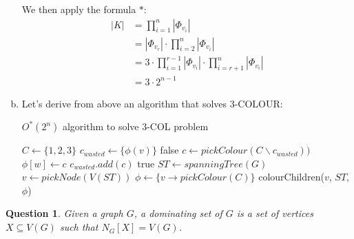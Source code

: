 \documentclass{article}
\newtheorem{Question}[theorem]{Question}
\begin{document}
\begin{enumerate}[(a)]
\begin{itemize}
    \end{itemize}
    We then apply the formula $*$:
    \begin{align*}
        |K|&=\prod_{i=1}^{n}|\Phi_{v_i}|\\
        &=|\Phi_{v_r}| \cdot \prod_{i=2}^{n}|\Phi_{v_i}|\\
        &=3 \cdot \prod_{i=1}^{r-1}|\Phi_{v_i}| \cdot \prod_{i=r+1}^{n}|\Phi_{v_i}|\\
        &= 3 \cdot 2^{n-1}
    \end{align*}
    \item Let's derive from above an algorithm that solves 3-COLOUR:
    \begin{algorithm}[H]
        \caption{$O^*(2^n)$ algorithm to solve 3-COL problem}    
        \begin{algorithmic}
            \State $C \gets \{1, 2, 3\}$
                    \State $c_{wasted} \gets \{\phi(v)\}$
                    \Repeat
                            \State \Return false
                        \EndIf
                        \State $c \gets pickColour(C\backslash c_{wasted}))$
                        \State $\phi[w] \gets c$
                        \State $c_{wasted}.add(c)$
                \EndFor
            \State \Return true
            \EndFunction
            \State \(ST \gets spanningTree(G)\)
            \State $v \gets pickNode(V(ST))$
            \State $\phi \gets \{v \rightarrow pickColour(C)\}$
            \State colourChildren($v$, $ST$, $\phi$)
        \end{algorithmic}
    \end{algorithm}
\end{enumerate}
\begin{Question}
    Given a graph $G$, a dominating set of $G$ is a set of vertices $X \subseteq V(G)$ such that $N_G[X] = V (G)$.
\end{Question}
\end{document}
